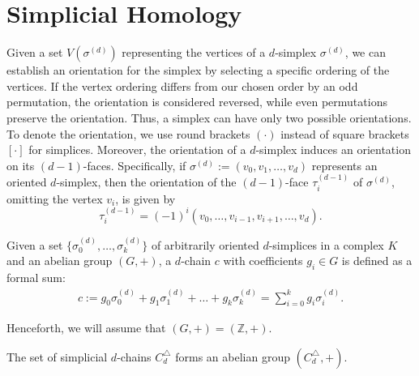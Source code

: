 \section{Simplicial Homology}
\label{SimplicialHomology}
Given a set \( V(\sigma^{(d)}) \) representing the vertices of a \( d \)-simplex
\( \sigma^{(d)} \), we can establish an orientation for the simplex by selecting a
specific ordering of the vertices. If the vertex ordering differs from our chosen
order by an odd permutation, the orientation is considered reversed, while even permutations
preserve the orientation. Thus, a simplex can have only two possible orientations. To denote the orientation, we use round brackets $(\cdot)$ instead of square brackets $[\cdot]$ for simplices.
Moreover, the orientation of a \( d \)-simplex induces an orientation on its \( (d-1) \)-faces.
Specifically, if \( \sigma^{(d)} := (v_{0}, v_{1}, \ldots, v_{d}) \) represents an oriented
\( d \)-simplex, then the orientation of the \( (d-1) \)-face \( \tau_i^{(d-1)} \) of
\( \sigma^{(d)} \), omitting the vertex \( v_{i} \), is given by
\begin{equation}
	\tau_{i}^{(d-1)} = (-1)^{i} (v_{0}, \ldots, v_{i-1}, v_{i+1}, \ldots, v_{d}).
\end{equation}

\begin{definition}[$d$-chain]{\cite[\S 2.3]{zomorodian2004computing}}
	\label{d-Chain}
	Given a set \(\{\sigma_{0}^{(d)}, \ldots, \sigma_{k}^{(d)}\}\) of arbitrarily oriented \(d\)-simplices in a complex \(K\) and an abelian group \((G,+)\), a \(d\)-chain \(c\) with coefficients \(g_{i} \in G\) is defined as a formal sum:
	\begin{align}
		c := g_{0}\sigma^{(d)}_{0} + g_{1}\sigma^{(d)}_{1} + \ldots + g_{k}\sigma^{(d)}_{k} = \sum_{i=0}^{k} g_{i}\sigma^{(d)}_{i}. 
	\end{align}
\end{definition}

Henceforth, we will assume that \( (G,+) = (\mathbb{Z}, +) \).

\begin{lemma}
	The set of simplicial \( d \)-chains \( C^{\triangle}_{d} \) forms an abelian group \( (C^{\triangle}_{d}, +) \).
\end{lemma}

